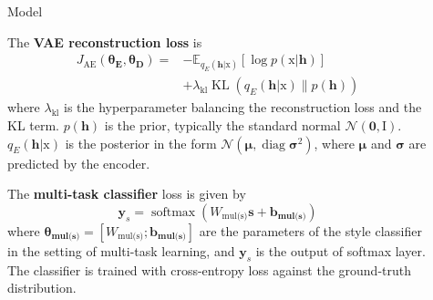 \documentclass[final]{beamer}
\newlength{\sepwid}
\newlength{\onecolwid}
\newlength{\twocolwid}
\newcommand{\rmx}{\mathrm x}
\newcommand{\loss}[1]{J_{\text{#1}}}
\newcommand{\hyp}[1]{\lambda_{\text{#1}}}
\newcommand{\nnweight}[1]{\bm{\theta_{\text{#1}}}}
\newcommand{\weight}[1]{W_{\text{#1}}}
\newcommand{\bias}[1]{\bm{b_{\text{#1}}}}
\begin{document}
\begin{frame}[t]
\begin{columns}[t]
\begin{column}{\onecolwid}

        \end{column} %

        \begin{column}{\sepwid}\end{column} %

        \begin{column}{\twocolwid} %

            \begin{columns}[t,totalwidth=\twocolwid] %

                \begin{column}{\onecolwid}\vspace{-.6in} %


                    \begin{block}{Model}

                        The \textbf{VAE \cite{kingma2013auto} reconstruction loss} is
                        \begin{align*}
                            \loss{AE}(\nnweight{E}, \nnweight{D}) = & - \mathbb{E}_{q_{E}(\bm h|\rmx)} [\log p(\rmx|\bm h)]    \\
                                                                    & + \hyp{kl}\operatorname{KL}(q_{E}(\bm h|\rmx)\|p(\bm h))
                        \end{align*}
                        where $\hyp{kl}$ is the hyperparameter balancing the reconstruction loss and the KL term. $p(\bm h)$ is the prior, typically the standard normal  $\mathcal{N}(\bm 0,\mathrm I)$. $q_E(\bm h|\mathrm x)$ is the posterior in the form $\mathcal{N}(\bm \mu,\operatorname{diag} \bm\sigma^2)$, where $\bm\mu$ and $\bm\sigma$ are predicted by the encoder.

                        The \textbf{multi-task classifier} loss is given by
                        \begin{equation*}
                            \bm y_s = \operatorname{softmax}(\weight{mul(s)} \bm s + \bias{mul(s)})
                        \end{equation*}
                        where $\nnweight{mul(s)}=[\weight{mul(s)}; \bias{mul(s)}]$ are the parameters of the style classifier in the setting of multi-task learning, and $\bm y_s$ is the output of softmax layer.
                        The classifier is trained with cross-entropy loss against the ground-truth distribution.


\end{block}
\end{column}
\end{columns}
\end{column}
\end{columns}
\end{frame}
\end{document}

